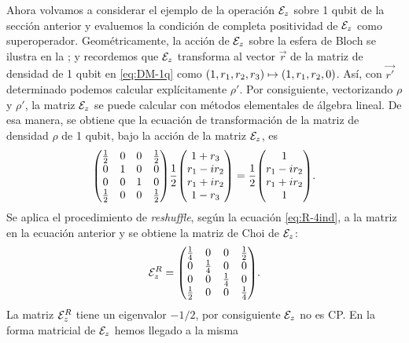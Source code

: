 Ahora volvamos a considerar el ejemplo de la operación $\mathcal{E}_z$ 
sobre 1 qubit de la sección anterior y evaluemos la condición de 
completa positividad de $\mathcal{E}_z$ como superoperador. 
Geométricamente, la acción de $\mathcal{E}_z$ sobre la 
esfera de Bloch se ilustra en la ;
y recordemos que $\mathcal{E}_z$ transforma al vector $\vec{r}$ 
de la matriz de densidad de 1 qubit en \eqref{eq:DM-1q} 
como $\qty(1,r_1,r_2,r_3)\mapsto\qty(1,r_1,r_2,0)$. Así, 
con $\vec{r'}$ determinado podemos calcular 
explícitamente $\rho'$.
Por consiguiente, vectorizando $\rho$ y $\rho'$, la matriz $\mathcal{E}_z$ 
se puede calcular con métodos elementales de álgebra lineal. 
De esa manera, se obtiene que la ecuación de transformación 
de la matriz de densidad $\rho$ de 1 qubit, bajo la
acción de la matriz $\mathcal{E}_z$, es
\begin{align}
\mqty(
\frac{1}{2} & 0 & 0 & \frac{1}{2} \\
0 & 1 & 0 & 0 \\
0 & 0 & 1 & 0 \\
\frac{1}{2} & 0 & 0 & \frac{1}{2} \\
)
\frac{1}{2}
\mqty(
1+r_3\\r_1-ir_2\\r_1+ir_2\\1-r_3
)
=
\frac{1}{2}
\mqty(
1\\r_1-ir_2\\r_1+ir_2\\1
).
\label{eq:Ez-matrix}
\end{align}
Se aplica el procedimiento de \textit{reshuffle},
según la ecuación \eqref{eq:R-4ind}, a la matriz en la ecuación 
anterior y se obtiene la matriz de Choi de $\mathcal{E}_z$:
\begin{align}
\E_z^R=
\mqty(
\frac{1}{4} & 0 & 0 & \frac{1}{2} \\
0 & \frac{1}{4} & 0 & 0 \\
0 & 0 & \frac{1}{4} & 0 \\
\frac{1}{2} & 0 & 0 & \frac{1}{4} 
).
\label{eq:ch2-Choi-Ez}
\end{align}
La matriz $\mathcal{E}_z^R$ tiene un eigenvalor $-1/2$, 
por consiguiente $\mathcal{E}_z$ no es CP. 
En la forma matricial de $\mathcal{E}_z$ hemos llegado a la misma

